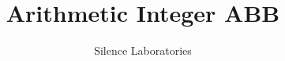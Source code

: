 \documentclass{article}
\begin{document}
\title{Arithmetic Integer ABB}
\author{Silence Laboratories}
\maketitle





\end{document}
